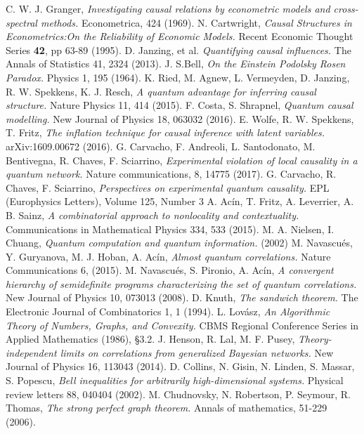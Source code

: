 \documentclass[letterpaper]{article}
\begin{document}
\begin{thebibliography}{}
     C. W. J. Granger, 
        {\em Investigating causal relations by econometric models and cross-spectral methods.}
        Econometrica, 424 (1969).
     N. Cartwright, 
        {\em Causal Structures in Econometrics:On the Reliability of Economic Models.}
        Recent Economic Thought Series \textbf{42}, pp 63-89 (1995).
     D. Janzing, et al. 
        {\em Quantifying causal influences.} 
        The Annals of Statistics 41, 2324 (2013).
     J. S.Bell, 
        {\em On the Einstein Podolsky Rosen Paradox.} 
        Physics 1, 195 (1964).
     K. Ried, M. Agnew, L. Vermeyden, D. Janzing, R. W. Spekkens, K. J. Resch, 
        {\em A quantum advantage for inferring causal structure.}
        Nature Physics 11, 414 (2015).
      F. Costa, S. Shrapnel,
        {\em Quantum causal modelling.} 
        New Journal of Physics 18, 063032 (2016).
     E. Wolfe, R. W. Spekkens, T. Fritz, 
        {\em The inflation technique for causal inference with latent variables.} arXiv:1609.00672 (2016). 
     G. Carvacho, F. Andreoli, L. Santodonato, M. Bentivegna, R. Chaves, F. Sciarrino, 
        {\em Experimental violation of local causality in a quantum network.}
        Nature communications, 8, 14775 (2017).
     G. Carvacho, R. Chaves, F. Sciarrino, 
        {\em Perspectives on experimental quantum causality.} 
        EPL (Europhysics Letters), Volume 125, Number 3
     A. Acín, T. Fritz, A. Leverrier, A. B. Sainz,
        {\em A combinatorial approach to nonlocality and contextuality.} 
        Communications in Mathematical Physics 334, 533 (2015).
     M. A. Nielsen, I. Chuang, 
        {\em Quantum computation and quantum information.} 
        (2002)
      M. Navascués, Y. Guryanova, M. J. Hoban, A. Acín,       
        {\em Almost quantum correlations.}
        Nature Communications 6, (2015).
      M. Navascués, S. Pironio, A. Acín, 
         {\em A convergent hierarchy of semidefinite programs characterizing the
         set of quantum correlations.}
         New Journal of Physics 10, 073013 (2008).
    D. Knuth, 
        {\em The sandwich theorem.}
        The Electronic Journal of Combinatorics 1, 1 (1994).
    L. Lovász, 
         {\em An Algorithmic Theory of Numbers, Graphs, and Convexity.}
         CBMS Regional Conference Series in Applied Mathematics (1986), §3.2.
    J. Henson, R. Lal, M. F. Pusey,
        {\em Theory-independent limits on correlations from generalized Bayesian networks.}
        New Journal of Physics 16, 113043 (2014).
    D. Collins, N. Gisin, N. Linden, S. Massar, S. Popescu,
        {\em Bell inequalities for arbitrarily high-dimensional systems.}
        Physical review letters 88, 040404 (2002).
    M. Chudnovsky, N. Robertson, P. Seymour, R. Thomas, 
         {\em The strong perfect graph theorem.} 
         Annals of mathematics, 51-229 (2006).

\end{thebibliography}
\end{document}
